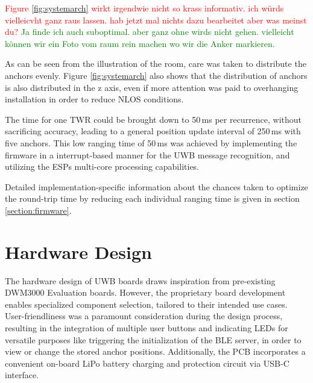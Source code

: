 \documentclass[conference, a4paper]{IEEEtran}
\begin{document}
\textcolor{red}{Figure \ref{fig:systemarch} wirkt irgendwie nicht so krass informativ. ich würds vielleicvht ganz raus lassen. hab jetzt mal nichts dazu bearbeitet aber was meinst du?}
\textcolor{green}{Ja finde ich auch suboptimal. aber ganz ohne wirds nicht gehen. vielleicht können wir ein Foto vom raum rein machen wo wir die Anker markieren.}

As can be seen from the illustration of the room, care was taken to distribute the anchors evenly.
Figure \ref{fig:systemarch} also shows that the distribution of anchors is also distributed in the z axis, even if more attention was paid to overhanging installation in order to reduce \ac{NLOS} conditions.

The time for one \ac{TWR} could be brought down to 50\,ms per recurrence, without sacrificing accuracy,
leading to a general position update interval of 250\,ms with five anchors. 
This low ranging time of 50\,ms was achieved by implementing the firmware in a interrupt-based manner for the \ac{UWB} message recognition, and utilizing the ESPs multi-core processing capabilities.

Detailed implementation-specific information about the chances taken to optimize the round-trip time by reducing each individual ranging time
is given in section \ref{section:firmware}.


\section{Hardware Design}\label{section:hardware}
The hardware design of \ac{UWB} boards draws inspiration from pre-existing DWM3000 Evaluation
boards.
However, the proprietary board development enables specialized component selection, tailored to their intended use cases.
User-friendliness was a paramount consideration during the design process,
resulting in the integration of multiple user buttons and indicating LEDs for versatile purposes like triggering the initialization of the \ac{BLE} server, in order to view or change the stored anchor positions. 
Additionally, the PCB incorporates a convenient on-board LiPo battery charging and protection circuit via USB-C interface.
\end{document}
